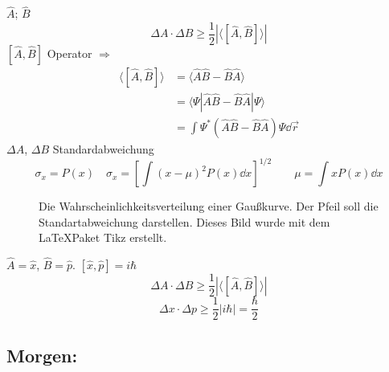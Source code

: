 \begin{enumerate}[i)]
	$ \hat{A} $; $ \hat{B} $
	\begin{equation*}
	\Delta A \cdot \Delta B \ge \frac{1}{2} \left| \langle \left[\hat{A}, \hat{B}\right] \rangle \right|
	\end{equation*}
	$ \left[\hat{A}, \hat{B}\right] $ Operator $ \Rightarrow $
	\begin{align*}
	\langle \left[\hat{A}, \hat{B}\right] \rangle &= \langle \hat{A} \hat{B} - \hat{B} \hat{A} \rangle \\
	&= \langle \Psi | \hat{A} \hat{B} - \hat{B} \hat{A} | \Psi \rangle \\
	&= \int \Psi^* \left(\hat{A} \hat{B} - \hat{B} \hat{A}\right) \Psi \dd \vec{r}
	\end{align*}
	$ \Delta A $, $ \Delta B $ Standardabweichung
	\begin{equation*}
	\sigma_x = P(x) \quad \sigma_x = \left[ \int (x - \mu)^2 P(x) \dd x \right]^{1/2}  \qquad \mu = \int x P(x) \dd x
	\end{equation*}
	
	
	\begin{figure}
		\centering
		\label{Gausverteilung}
		\caption{Die Wahrscheinlichkeitsverteilung einer Gaußkurve. Der Pfeil soll die Standartabweichung darstellen. Dieses Bild wurde mit dem \LaTeX Paket Tikz erstellt.}
	\end{figure}
	
	$ \hat{A} = \hat{x} $, $ \hat{B} = \hat{p} $. $ \left[\hat{x}, \hat{p}\right] = i \hbar $
	\begin{equation*}
	\Delta A \cdot \Delta B \ge \frac{1}{2} \left| \langle \left[\hat{A}, \hat{B}\right] \rangle \right|
	\end{equation*}
	\begin{equation*}
	\Delta x \cdot \Delta p \ge \frac{1}{2} \left| i \hbar \right| = \frac{\hbar}{2}
	\end{equation*}	
\end{enumerate}

\subsection*{Morgen:}


